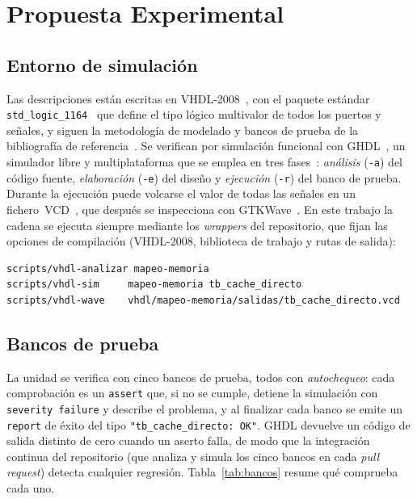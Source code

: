 \documentclass[llncs]{llncs}
\begin{document}
\section{Propuesta Experimental}
\label{sec:propuesta}

\subsection{Entorno de simulación}

Las descripciones están escritas en VHDL-2008~\cite{ieee1076}, con el
paquete estándar \texttt{std\_logic\_1164}~\cite{ieee1164} que define el
tipo lógico multivalor de todos los puertos y señales, y siguen la
metodología de modelado y bancos de prueba de la bibliografía de
referencia~\cite{harris2008}. Se verifican por simulación funcional con GHDL~\cite{ghdl-docs}, un
simulador libre y multiplataforma que se emplea en tres
fases~\cite{ghdl-invoking}: \emph{análisis} (\texttt{-a}) del código
fuente, \emph{elaboración} (\texttt{-e}) del diseño y \emph{ejecución}
(\texttt{-r}) del banco de prueba. Durante la ejecución puede volcarse
el valor de todas las señales en un fichero~VCD~\cite{ghdl-simulation},
que después se inspecciona con GTKWave~\cite{gtkwave-docs}. En este
trabajo la cadena se ejecuta siempre mediante los \emph{wrappers} del
repositorio, que fijan las opciones de compilación (VHDL-2008,
biblioteca de trabajo y rutas de salida):

\begin{lstlisting}[style=shell]
scripts/vhdl-analizar mapeo-memoria
scripts/vhdl-sim     mapeo-memoria tb_cache_directo
scripts/vhdl-wave    vhdl/mapeo-memoria/salidas/tb_cache_directo.vcd
\end{lstlisting}

\subsection{Bancos de prueba}

La unidad se verifica con cinco bancos de prueba, todos con
\emph{autochequeo}: cada comprobación es un \texttt{assert} que, si no
se cumple, detiene la simulación con \texttt{severity failure} y
describe el problema, y al finalizar cada banco se emite un
\texttt{report} de éxito del tipo
\texttt{"tb\_cache\_directo:\ OK"}. GHDL devuelve un código de salida
distinto de cero cuando un aserto falla, de modo que la integración
continua del repositorio (que analiza y simula los cinco bancos en
cada \emph{pull request}) detecta cualquier regresión.
Tabla~\ref{tab:bancos} resume qué comprueba cada uno.
\end{document}
